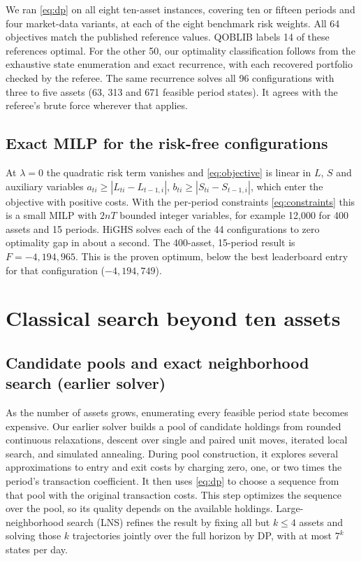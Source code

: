 \documentclass[a4paper]{article}
\begin{document}
We ran \eqref{eq:dp} on all eight ten-asset instances, covering ten or fifteen periods and four market-data variants,
at each of the eight benchmark risk weights. All 64 objectives match the published reference values.
QOBLIB labels 14 of these references optimal. For the other 50, our optimality classification follows
from the exhaustive state enumeration and exact recurrence, with each recovered portfolio checked by the referee.
The same recurrence solves all 96 configurations with three to five assets (63, 313 and 671 feasible period states).
It agrees with the referee's brute force wherever that applies.

\subsection{Exact MILP for the risk-free configurations}

At \(\lambda=0\) the quadratic risk term vanishes and \eqref{eq:objective} is linear in \(L\), \(S\) and auxiliary
variables \(a_{ti}\ge|L_{ti}-L_{t-1,i}|\), \(b_{ti}\ge|S_{ti}-S_{t-1,i}|\), which enter the objective with positive costs.
With the per-period constraints \eqref{eq:constraints} this is a small MILP with \(2nT\) bounded integer variables,
for example 12,000 for 400 assets and 15 periods. HiGHS solves each of the 44 configurations to zero optimality gap in about a second.
The 400-asset, 15-period result is \(F=-4{,}194{,}965\). This is the proven optimum, below the best leaderboard
entry for that configuration (\(-4{,}194{,}749\)).

\clearpage
\section{Classical search beyond ten assets}

\subsection{Candidate pools and exact neighborhood search (earlier solver)}

As the number of assets grows, enumerating every feasible period state becomes expensive.
Our earlier solver builds a pool of candidate holdings from rounded continuous relaxations, descent over single
and paired unit moves, iterated local search, and simulated annealing. During pool construction, it explores
several approximations to entry and exit costs by charging zero, one, or two times the period's transaction
coefficient. It then uses \eqref{eq:dp} to choose a sequence from that pool with the original transaction costs.
This step optimizes the sequence over the pool, so its quality depends on the available holdings.
Large-neighborhood search (LNS) refines the result by fixing all but \(k\le4\) assets and solving
those \(k\) trajectories jointly over the full horizon by DP, with at most \(7^k\) states per day.
\end{document}
